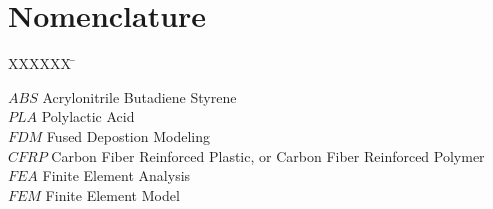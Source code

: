 \section*{Nomenclature}

\begin{tabbing}

  XXXXXX \= \kill%

  $ABS$ \> Acrylonitrile Butadiene Styrene\\
  $PLA$ \> Polylactic Acid\\
  $FDM$ \> Fused Depostion Modeling\\
  $CFRP$ \> Carbon Fiber Reinforced Plastic, or Carbon Fiber Reinforced Polymer\\
  $FEA$ \> Finite Element Analysis\\
  $FEM$ \> Finite Element Model\\
  
\end{tabbing}
